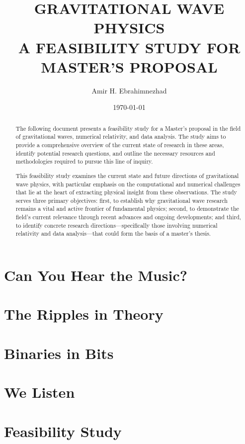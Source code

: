 \documentclass[11pt, a4paper]{report}
\begin{document}
    \title{GRAVITATIONAL WAVE PHYSICS \\ \small A FEASIBILITY STUDY FOR MASTER'S PROPOSAL}
    \author{Amir H. Ebrahimnezhad}
    \date{\today}

    \maketitle

    \begin{abstract}
        The following document presents a feasibility study for a Master's proposal in the field of gravitational waves, numerical relativity, and data analysis.
        The study aims to provide a comprehensive overview of the current state of research in these areas, identify potential research questions, and outline the necessary resources and methodologies required to pursue this line of inquiry.

        This feasibility study examines the current state and future directions of gravitational wave physics, with particular emphasis on the computational and numerical challenges that lie at the heart of extracting physical insight from these observations.
        The study serves three primary objectives: first, to establish why gravitational wave research remains a vital and active frontier of fundamental physics; second, to demonstrate the field's current relevance through recent advances and ongoing developments; and third, to identify concrete research directions—specifically those involving numerical relativity and data analysis—that could form the basis of a master's thesis.
    \end{abstract}

    \tableofcontents


    \chapter{Can You Hear the Music?}\label{ch:can-you-hear-the-music}
    

    \chapter{The Ripples in Theory}\label{ch:the-ripples-in-theory}
    

    \chapter{Binaries in Bits}\label{ch:binaries-in-bits}
    

    \chapter{We Listen}\label{ch:we-listen}
    

    \chapter{Feasibility Study}\label{ch:feasibility-study}


    \appendix
    

    \onecolumn
    
    
\end{document}
